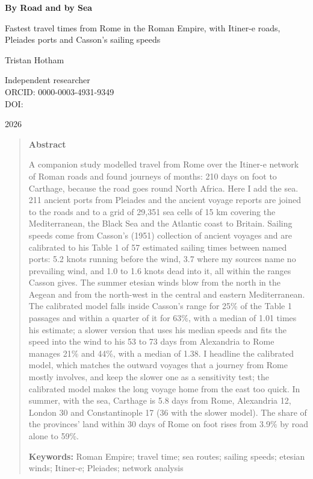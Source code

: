 \documentclass[11pt,a4paper]{article}
\begin{document}
\begin{center}
{\Large\bfseries By Road and by Sea\par}
\vspace{0.4em}
{\large Fastest travel times from Rome in the Roman Empire, with Itiner-e roads,\\Pleiades ports and Casson's sailing speeds\par}
\vspace{1.2em}
{\large Tristan Hotham\par}
\vspace{0.3em}
{\small Independent researcher\\
ORCID: 0000-0003-4931-9349\\
DOI: \par}
\vspace{0.8em}
2026
\end{center}

\begin{quote}
\small
\begin{center}\textbf{Abstract}\end{center}
A companion study modelled travel from Rome over the Itiner-e network of Roman roads and found journeys of months: 210 days on foot to Carthage, because the road goes round North Africa. Here I add the sea. 211 ancient ports from Pleiades and the ancient voyage reports are joined to the roads and to a grid of 29,351 sea cells of 15 km covering the Mediterranean, the Black Sea and the Atlantic coast to Britain. Sailing speeds come from Casson's (1951) collection of ancient voyages and are calibrated to his Table 1 of 57 estimated sailing times between named ports: 5.2 knots running before the wind, 3.7 where my sources name no prevailing wind, and 1.0 to 1.6 knots dead into it, all within the ranges Casson gives. The summer etesian winds blow from the north in the Aegean and from the north-west in the central and eastern Mediterranean. The calibrated model falls inside Casson's range for 25\% of the Table 1 passages and within a quarter of it for 63\%, with a median of 1.01 times his estimate; a slower version that uses his median speeds and fits the speed into the wind to his 53 to 73 days from Alexandria to Rome manages 21\% and 44\%, with a median of 1.38. I headline the calibrated model, which matches the outward voyages that a journey from Rome mostly involves, and keep the slower one as a sensitivity test; the calibrated model makes the long voyage home from the east too quick. In summer, with the sea, Carthage is 5.8 days from Rome, Alexandria 12, London 30 and Constantinople 17 (36 with the slower model). The share of the provinces' land within 30 days of Rome on foot rises from 3.9\% by road alone to 59\%.

\textbf{Keywords:} Roman Empire; travel time; sea routes; sailing speeds; etesian winds; Itiner-e; Pleiades; network analysis
\end{quote}
\end{document}
